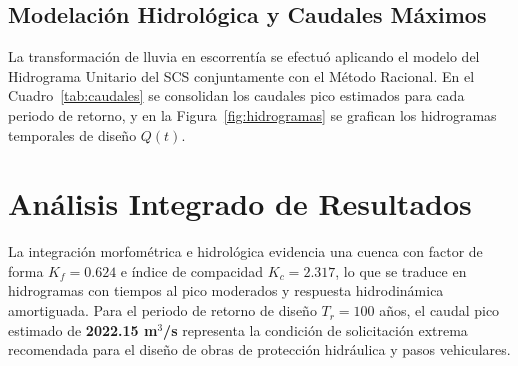 \documentclass[11pt,a4paper]{article}
\begin{document}
\subsection{Modelación Hidrológica y Caudales Máximos}
La transformación de lluvia en escorrentía se efectuó aplicando el modelo del Hidrograma Unitario del SCS conjuntamente con el Método Racional. En el Cuadro~\ref{tab:caudales} se consolidan los caudales pico estimados para cada periodo de retorno, y en la Figura~\ref{fig:hidrogramas} se grafican los hidrogramas temporales de diseño $Q(t)$.

\begin{table}[H]
\centering
\caption{Resumen de caudales pico obtenidos para diferentes periodos de retorno.}
\label{tab:caudales}
\end{table}



\section{Análisis Integrado de Resultados}
La integración morfométrica e hidrológica evidencia una cuenca con factor de forma $K_f = 0.624$ e índice de compacidad $K_c = 2.317$, lo que se traduce en hidrogramas con tiempos al pico moderados y respuesta hidrodinámica amortiguada. Para el periodo de retorno de diseño $T_r = 100$ años, el caudal pico estimado de \textbf{2022.15 m$^3$/s} representa la condición de solicitación extrema recomendada para el diseño de obras de protección hidráulica y pasos vehiculares.
\end{document}
